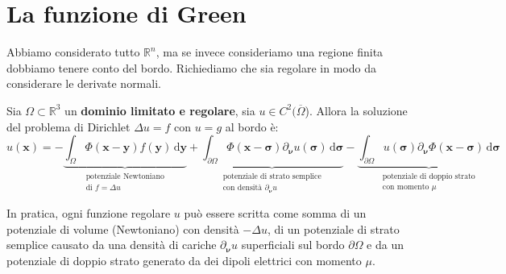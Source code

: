 \documentclass[10pt,a4paper,twoside,openright]{book}
\newcommand{\x}{\mathbf{x}}
\newcommand{\y}{\mathbf{y}}
\newcommand{\sigg}{\bm{\sigma}}
\newcommand{\nuu}{\bm{\nu}}
\newcommand{\de}{\,\mathrm d}
\newcommand{\dyy}{\de \y}
\newcommand{\dsig}{\de \sigg}
\begin{document}
\section{La funzione di Green}
Abbiamo considerato tutto $\mathbb{R} ^{n} $, ma se invece consideriamo una regione finita dobbiamo tenere conto del bordo. Richiediamo che sia regolare in modo da considerare le derivate normali.
\begin{theorem}
	Sia $\displaystyle \Omega \subset \mathbb{R}^{3}$ un \textbf{dominio limitato e regolare}, sia $\displaystyle u\in C^{2}(\overline{\Omega }$). Allora la soluzione del problema di Dirichlet $\Delta u=f$ con $u=g$ al bordo è:
	\begin{equation*}
		u(\x)=-\underbrace{\int _{\Omega } \Phi (\x-\y) f(\y) \dyy}_{\substack{\text{potenziale Newtoniano}\\\text{di } f=\Delta u}}
  			  +\underbrace{\int _{\partial \Omega } \Phi (\x-\sigg) \partial _{\nuu} u(\sigg) \dsig }_{\substack{\text{potenziale di strato semplice}\\\text{con densità }\partial _{\nuu} u}}
  			  -\underbrace{\int _{\partial \Omega } u(\sigg) \partial _{\nuu} \Phi (\x-\sigg) \dsig }_{ \substack{\text{potenziale di doppio strato}\\\text{con momento }\mu}}
	\end{equation*}
\end{theorem}
In pratica, ogni funzione regolare $u$ può essere scritta come somma di un potenziale di volume (Newtoniano) con densità $\displaystyle -\Delta u$, di un potenziale di strato semplice causato da una densità di cariche $\displaystyle \partial _{\nuu} u$ superficiali sul bordo $\displaystyle \partial \Omega $ e da un potenziale di doppio strato generato da dei dipoli elettrici con momento $\mu $.
\end{document}
